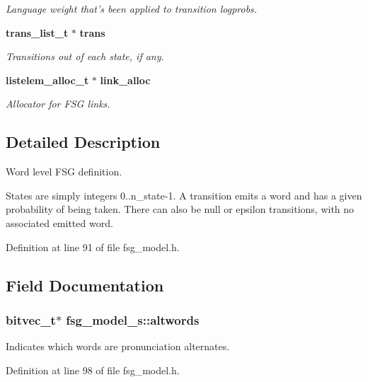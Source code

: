 \begin{DoxyCompactItemize}
\begin{DoxyCompactList}\small\item\em Language weight that's been applied to transition logprobs. \end{DoxyCompactList}\item 
{\bf trans\-\_\-list\-\_\-t} $\ast$ {\bf trans}
\begin{DoxyCompactList}\small\item\em Transitions out of each state, if any. \end{DoxyCompactList}\item 
{\bf listelem\-\_\-alloc\-\_\-t} $\ast$ {\bf link\-\_\-alloc}
\begin{DoxyCompactList}\small\item\em Allocator for F\-S\-G links. \end{DoxyCompactList}\end{DoxyCompactItemize}


\subsection{Detailed Description}
Word level F\-S\-G definition. 

States are simply integers 0..n\-\_\-state-\/1. A transition emits a word and has a given probability of being taken. There can also be null or epsilon transitions, with no associated emitted word. 

Definition at line 91 of file fsg\-\_\-model.\-h.



\subsection{Field Documentation}
\subsubsection[{altwords}]{\setlength{\rightskip}{0pt plus 5cm}bitvec\-\_\-t$\ast$ fsg\-\_\-model\-\_\-s\-::altwords}\label{structfsg__model__s_adb51d840853d7ef3315bd833cddeb748}


Indicates which words are pronunciation alternates. 



Definition at line 98 of file fsg\-\_\-model.\-h.

